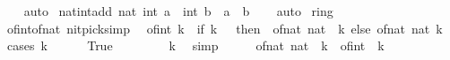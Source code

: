 \begin{isabellebody}
%
\isadelimproof
\ \ %
\endisadelimproof
%
\isatagproof
{}\isamarkupfalse%
\ auto%
\endisatagproof
{\isafoldproof}%
%
\isadelimproof
\isanewline
%
\endisadelimproof
\isanewline
{}\isamarkupfalse%
\ nat{\isacharunderscore}{\kern0pt}int{\isacharunderscore}{\kern0pt}add{\isacharcolon}{\kern0pt}\ {\isachardoublequoteopen}nat\ {\isacharparenleft}{\kern0pt}int\ a\ {\isacharplus}{\kern0pt}\ int\ b{\isacharparenright}{\kern0pt}\ {\isacharequal}{\kern0pt}\ a\ {\isacharplus}{\kern0pt}\ b{\isachardoublequoteclose}\isanewline
%
\isadelimproof
\ \ %
\endisadelimproof
%
\isatagproof
{}\isamarkupfalse%
\ auto%
\endisatagproof
{\isafoldproof}%
%
\isadelimproof
\isanewline
%
\endisadelimproof
\isanewline
{}\isamarkupfalse%
\ ring{\isacharunderscore}{\kern0pt}{}\isanewline
{}\isanewline
\isanewline
{}\isamarkupfalse%
\ of{\isacharunderscore}{\kern0pt}int{\isacharunderscore}{\kern0pt}of{\isacharunderscore}{\kern0pt}nat\ {\isacharbrackleft}{\kern0pt}nitpick{\isacharunderscore}{\kern0pt}simp{\isacharbrackright}{\kern0pt}{\isacharcolon}{\kern0pt}\isanewline
\ \ {\isachardoublequoteopen}of{\isacharunderscore}{\kern0pt}int\ k\ {\isacharequal}{\kern0pt}\ {\isacharparenleft}{\kern0pt}if\ k\ {\isacharless}{\kern0pt}\ {}\ then\ {\isacharminus}{\kern0pt}\ of{\isacharunderscore}{\kern0pt}nat\ {\isacharparenleft}{\kern0pt}nat\ {\isacharparenleft}{\kern0pt}{\isacharminus}{\kern0pt}\ k{\isacharparenright}{\kern0pt}{\isacharparenright}{\kern0pt}\ else\ of{\isacharunderscore}{\kern0pt}nat\ {\isacharparenleft}{\kern0pt}nat\ k{\isacharparenright}{\kern0pt}{\isacharparenright}{\kern0pt}{\isachardoublequoteclose}\isanewline
%
\isadelimproof
%
\endisadelimproof
%
\isatagproof
{}\isamarkupfalse%
\ {\isacharparenleft}{\kern0pt}cases\ {\isachardoublequoteopen}k\ {\isacharless}{\kern0pt}\ {}{\isachardoublequoteclose}{\isacharparenright}{\kern0pt}\isanewline
\ \ \isamarkupfalse%
\ True\isanewline
\ \ \isamarkupfalse%
\ \isamarkupfalse%
\ {\isachardoublequoteopen}{}\ {\isasymle}\ {\isacharminus}{\kern0pt}\ k{\isachardoublequoteclose}\ \isamarkupfalse%
\ simp\isanewline
\ \ \isamarkupfalse%
\ \isamarkupfalse%
\ {\isachardoublequoteopen}of{\isacharunderscore}{\kern0pt}nat\ {\isacharparenleft}{\kern0pt}nat\ {\isacharparenleft}{\kern0pt}{\isacharminus}{\kern0pt}\ k{\isacharparenright}{\kern0pt}{\isacharparenright}{\kern0pt}\ {\isacharequal}{\kern0pt}\ of{\isacharunderscore}{\kern0pt}int\ {\isacharparenleft}{\kern0pt}{\isacharminus}{\kern0pt}\ k{\isacharparenright}{\kern0pt}{\isachardoublequoteclose}\ \isamarkupfalse%

\end{isabellebody}
